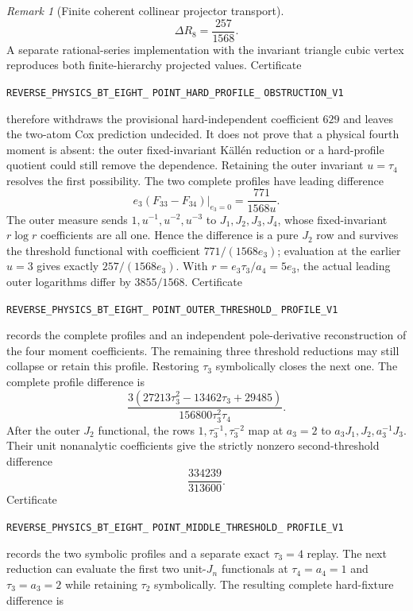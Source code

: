 \documentclass[11pt]{article}
\theoremstyle{definition}
\theoremstyle{remark}
\newtheorem{remark}[theorem]{Remark}
\begin{document}
\begin{remark}[Finite coherent collinear projector transport]
\[
 \Delta R_8=\frac{257}{1568}.
\]
A separate rational-series implementation with the invariant triangle cubic
vertex reproduces both finite-hierarchy projected values.  Certificate
\par\noindent
\texttt{REVERSE\_PHYSICS\_BT\_EIGHT\_}\allowbreak
\texttt{POINT\_HARD\_PROFILE\_}\allowbreak
\texttt{OBSTRUCTION\_V1}
\par\noindent
therefore withdraws the provisional hard-independent coefficient $629$ and
leaves the two-atom Cox prediction undecided.  It does not prove that a
physical fourth moment is absent: the outer fixed-invariant K\"all\'en
reduction or a hard-profile quotient could still remove the dependence.
Retaining the outer invariant $u=\tau_4$ resolves the first possibility.  The
two complete profiles have leading difference
\[
 e_3(F_{33}-F_{34})\big|_{e_3=0}=\frac{771}{1568u}.
\]
The outer measure sends $1,u^{-1},u^{-2},u^{-3}$ to
$J_1,J_2,J_3,J_4$, whose fixed-invariant $r\log r$ coefficients are all
one.  Hence the difference is a pure $J_2$ row and survives the threshold
functional with coefficient $771/(1568e_3)$; evaluation at the earlier
$u=3$ gives exactly $257/(1568e_3)$.  With
$r=e_3\tau_3/a_4=5e_3$, the actual leading outer logarithms differ by
$3855/1568$.  Certificate
\par\noindent
\texttt{REVERSE\_PHYSICS\_BT\_EIGHT\_}\allowbreak
\texttt{POINT\_OUTER\_THRESHOLD\_}\allowbreak
\texttt{PROFILE\_V1}
\par\noindent
records the complete profiles and an independent pole-derivative
reconstruction of the four moment coefficients.  The remaining three
threshold reductions may still collapse or retain this profile.  Restoring
$\tau_3$ symbolically closes the next one.  The complete profile difference is
\[
 \frac{3(27213\tau_3^2-13462\tau_3+29485)}
 {156800\tau_3^2\tau_4}.
\]
After the outer $J_2$ functional, the rows
$1,\tau_3^{-1},\tau_3^{-2}$ map at $a_3=2$ to
$a_3J_1,J_2,a_3^{-1}J_3$.  Their unit nonanalytic coefficients give the
strictly nonzero second-threshold difference
\[
 \frac{334239}{313600}.
\]
Certificate
\par\noindent
\texttt{REVERSE\_PHYSICS\_BT\_EIGHT\_}\allowbreak
\texttt{POINT\_MIDDLE\_THRESHOLD\_}\allowbreak
\texttt{PROFILE\_V1}
\par\noindent
records the two symbolic profiles and a separate exact $\tau_3=4$ replay.
The next reduction can evaluate the first two unit-$J_n$ functionals at
$\tau_4=a_4=1$ and $\tau_3=a_3=2$ while retaining $\tau_2$ symbolically.
The resulting complete hard-fixture difference is

\end{remark}
\end{document}
